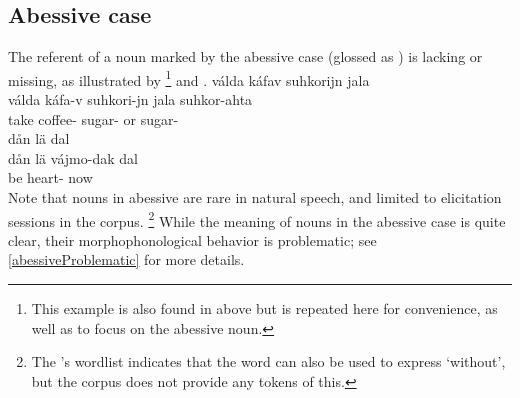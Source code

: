 \subsection{Abessive case}\label{abessive}%
The referent of a noun marked by the abessive case (glossed as \ABESSs) is lacking or missing, as illustrated by \footnote{This example is also found in  above but is repeated here for convenience, as well as to focus on the abessive noun.} 
and . 
\ea\label{abess1}
\glll	válda káfav suhkorijn jala \\
	válda káfa-v suhkori-jn jala suhkor-ahta\\
	take\BS{} coffee- sugar- or sugar-\\\nopagebreak
{} 
\z
%
\ea\label{abess2}
\glll	dån lä  dal\\
	dån lä vájmo-dak dal\\
	 be\BS{} heart- now\\\nopagebreak
{} 
\z
Note that nouns in abessive are rare in natural speech, and limited to elicitation sessions in the corpus.%
\footnote{The \WLP’s wordlist indicates that the word  can also be used to express ‘without’, but the corpus does not provide any tokens of this.} 
While the meaning of nouns in the abessive case is quite clear, their morphophonological behavior is problematic; see \SEC\ref{abessiveProblematic} for more details.


